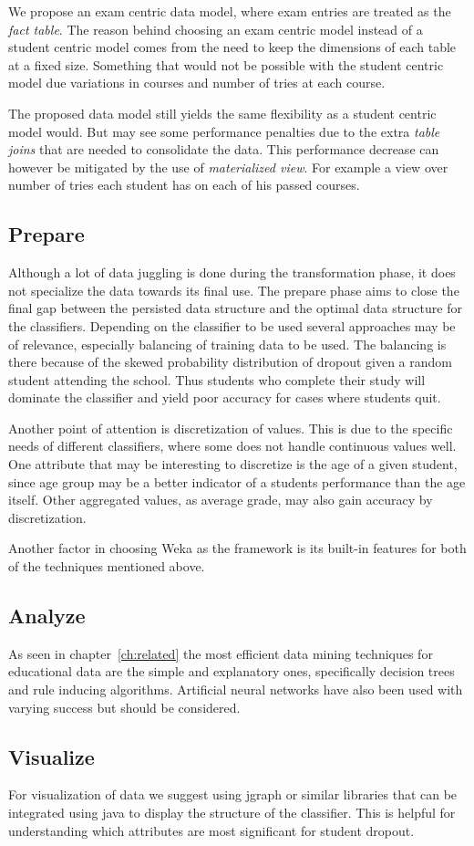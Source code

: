 \bigskip\noindent
We propose an exam centric data model, where exam entries are treated as the \textit{fact table}. 
The reason behind choosing an exam centric model instead of a student centric model comes from the
need to keep the dimensions of each table at a fixed size. Something that would not be possible 
with the student centric model due variations in courses and number of tries at each course.

The proposed data model still yields the same flexibility as a student centric model would. 
But may see some performance penalties due to the extra \textit{table joins} that are needed to consolidate the data.
This performance decrease can however be mitigated by the use of \textit{materialized view}.
For example a view over number of tries each student has on each of his passed courses.

\subsection{Prepare}
Although a lot of data juggling is done during the transformation phase, it does not specialize the data towards its final use. 
The prepare phase aims to close the final gap between the persisted data structure and the optimal data structure for the classifiers.
Depending on the classifier to be used several approaches may be of relevance, especially balancing of training data to be used.
The balancing is there because of the skewed probability distribution of dropout given a random student attending the school.
Thus students who complete their study will dominate the classifier and yield poor accuracy for cases where students quit.

\bigskip\noindent
Another point of attention is discretization of values. 
This is due to the specific needs of different classifiers, where some does not handle continuous values well. 
One attribute that may be interesting to discretize is the age of a given student, 
since age group may be a better indicator of a students performance than the age itself. 
Other aggregated values, as average grade, may also gain accuracy by discretization.

\bigskip\noindent
Another factor in choosing Weka as the framework is its built-in features for both of the techniques mentioned above. 

\subsection{Analyze}
As seen in chapter~\ref{ch:related} the most efficient data mining techniques for educational data are the simple and explanatory ones,
specifically decision trees and rule inducing algorithms.
Artificial neural networks have also been used with varying success but should be considered.

\subsection{Visualize}	
For visualization of data we suggest using jgraph or similar libraries that can be integrated using java to display the structure of the classifier.
This is helpful for understanding which attributes are most significant for student dropout. 

